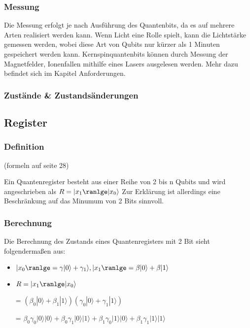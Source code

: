 \subsubsection{Messung}

Die Messung erfolgt je nach Ausführung des Quantenbits, da es auf mehrere Arten realisiert werden kann. Wenn Licht eine Rolle spielt, kann die Lichtstärke gemessen werden, wobei diese Art von Qubits nur kürzer als 1 Minuten gespeichert werden kann. Kernspinquantenbits können durch Messung der Magnetfelder, Ionenfallen mithilfe eines Lasers ausgelesen werden. Mehr dazu befindet sich im Kapitel Anforderungen.

\subsubsection{Zustände \& Zustandsänderungen}


\subsection{Register}
\label{sec:Register}

\subsubsection{Definition}
(formeln auf seite 28)

Ein Quantenregister besteht aus einer Reihe von 2 bis n Qubits und wird angeschrieben als $R = |x_1\ranlge|x_0\rangle$
Zur Erklärung ist allerdings eine Beschränkung auf das Minumum von 2 Bits sinnvoll.

\subsubsection{Berechnung}

Die Berechnung des Zustands eines Quantenregisters mit 2 Bit sieht folgendermaßen aus:
\begin{itemize}
    \item $|x_0\ranlge = \gamma|0\rangle + \gamma_1\rangle, |x_1\ranlge = \beta|0\rangle + \beta|1\rangle$
    \item $R = |x_1\ranlge|x_0\rangle$
	\item[=] $(\beta_0|0\rangle+\beta_1|1\rangle)(\gamma_0|0\rangle+\gamma_1|1\rangle)$
	\item[=] $\beta_0\gamma_0|0\rangle|0\rangle+\beta_0\gamma_1|0\rangle|1\rangle+\beta_1\gamma_0|1\rangle|0\rangle+\beta_1\gamma_1|1\rangle|1\rangle$
\end{itemize}

